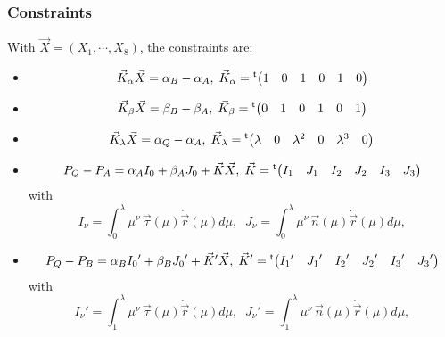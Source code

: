 \documentclass[11pt]{amsart}
\newcommand{\mytrn}[1]{{\!\!~^{\mathsf{t}}{#1}}}
\begin{document}
\subsubsection{Constraints}
With $\vec{X}=\left(X_1,\cdots,X_8\right)$, the constraints are:
\begin{itemize}
\item
\[
	\vec{K}_\alpha\vec{X} = \alpha_B-\alpha_A, \; \vec{K}_\alpha= \mytrn{\begin{pmatrix} 1 & 0 & 1 & 0 & 1 & 0\cr \end{pmatrix}}
\]
\item
\[
	\vec{K}_\beta\vec{X} = \beta_B-\beta_A, \; \vec{K}_\beta= \mytrn{\begin{pmatrix} 0 & 1 & 0 & 1 & 0 & 1\cr \end{pmatrix}}
\]
\item
\[
	\vec{K}_\lambda\vec{X} = \alpha_Q-\alpha_A, \;\vec{K}_\lambda= \mytrn{\begin{pmatrix} \lambda & 0 & \lambda^2 & 0 & \lambda^3 & 0\cr \end{pmatrix}}
 \]
 \item
 \[
 P_Q-P_A = \alpha_A I_0 + \beta_A J_0 + \vec{K}\vec{X},
 \;\vec{K} = \mytrn{\begin{pmatrix} I_1 & J_1 & I_2 & J_2 & I_3 & J_3\cr \end{pmatrix}}
 \]
 with
 \[
 	I_\nu = \int_0^\lambda \mu^\nu\, \vec{\tau}(\mu)\dot{\vec{r}}(\mu) d\mu,\;\;
 	J_\nu = \int_0^\lambda \mu^\nu\, \vec{n}(\mu)\dot{\vec{r}}(\mu) d\mu,
 \]
 \item
 \[
 P_Q-P_B = \alpha_B {I_0}' + \beta_B {J_0}' + \vec{K}'\vec{X},
 \;\vec{K}' = \mytrn{\begin{pmatrix} {I_1}' & {J_1}' & {I_2}' & {J_2}' & {I_3}' & {J_3}'\cr \end{pmatrix}}
 \]
 with
 \[
 	{I_\nu}' = \int_1^\lambda \mu^\nu\, \vec{\tau}(\mu)\dot{\vec{r}}(\mu) d\mu,\;\;
 	{J_\nu}' = \int_1^\lambda \mu^\nu\, \vec{n}(\mu)\dot{\vec{r}}(\mu) d\mu,
 \]
 \end{itemize}
\end{document}
